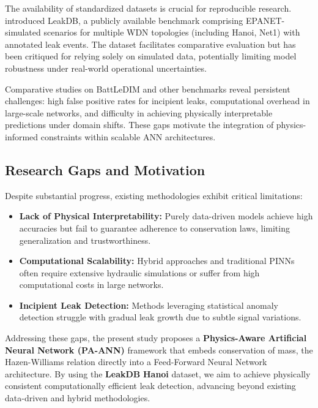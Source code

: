 \documentclass[final,5p,times,twocolumn,authoryear]{elsarticle}
\begin{document}
The availability of standardized datasets is crucial for reproducible research. \cite{kyriakou2018leakdb} introduced LeakDB, a publicly available benchmark comprising EPANET-simulated scenarios for multiple WDN topologies (including Hanoi, Net1) with annotated leak events. The dataset facilitates comparative evaluation but has been critiqued for relying solely on simulated data, potentially limiting model robustness under real-world operational uncertainties.

Comparative studies on BattLeDIM \cite{barros_leak_2025} and other benchmarks reveal persistent challenges: high false positive rates for incipient leaks, computational overhead in large-scale networks, and difficulty in achieving physically interpretable predictions under domain shifts. These gaps motivate the integration of physics-informed constraints within scalable ANN architectures.

\subsection{Research Gaps and Motivation}

Despite substantial progress, existing methodologies exhibit critical limitations:

\begin{itemize}
    \item \textbf{Lack of Physical Interpretability:} Purely data-driven models \cite{MAHDI2024100685, punukollu2023leakdetection} achieve high accuracies but fail to guarantee adherence to conservation laws, limiting generalization and trustworthiness.
    \item \textbf{Computational Scalability:} Hybrid approaches \cite{mazaev2022probabilisticleaklocalization} and traditional PINNs \cite{lin2025digitaltwin} often require extensive hydraulic simulations or suffer from high computational costs in large networks.
    \item \textbf{Incipient Leak Detection:} Methods leveraging statistical anomaly detection \cite{barros_leak_2025, TORNYEVIADZI2023106062} struggle with gradual leak growth due to subtle signal variations.
\end{itemize}

Addressing these gaps, the present study proposes a \textbf{Physics-Aware Artificial Neural Network (PA-ANN)} framework that embeds conservation of mass, the Hazen-Williams relation directly into a Feed-Forward Neural Network architecture. By using the \textbf{LeakDB} \textbf{Hanoi} dataset, we aim to achieve physically consistent computationally efficient leak detection, advancing beyond existing data-driven and hybrid methodologies.
\end{document}
